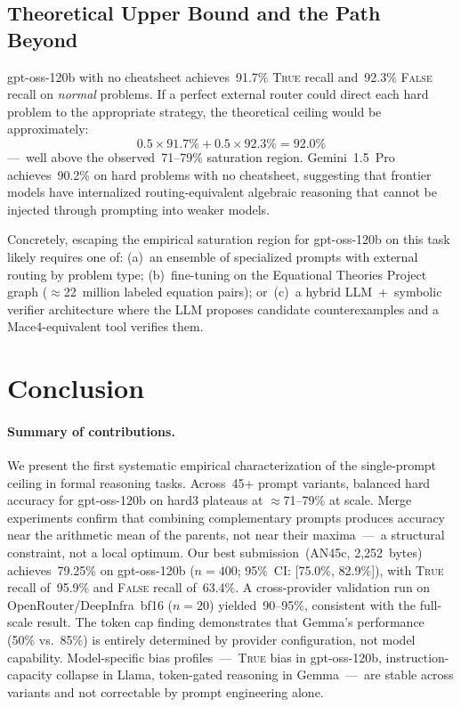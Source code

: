 \documentclass[11pt]{article}
\begin{document}
\subsection{Theoretical Upper Bound and the Path Beyond}

gpt-oss-120b with no cheatsheet achieves~91.7\% \textsc{True} recall
and~92.3\% \textsc{False} recall on \emph{normal} problems. If a
perfect external router could direct each hard problem to the
appropriate strategy, the theoretical ceiling would be approximately:
\[
  0.5 \times 91.7\% + 0.5 \times 92.3\% = 92.0\%
\]
---~well above the observed~71--79\% saturation region. Gemini~1.5~Pro
achieves~90.2\% on hard problems with no cheatsheet, suggesting that
frontier models have internalized routing-equivalent algebraic reasoning
that cannot be injected through prompting into weaker models.

Concretely, escaping the empirical saturation region for gpt-oss-120b
on this task likely requires one of:
(a)~an ensemble of specialized prompts with external routing by problem
type; (b)~fine-tuning on the Equational Theories Project graph
($\approx$22~million labeled equation pairs); or~(c)~a hybrid
LLM~+~symbolic verifier architecture where the LLM proposes candidate
counterexamples and a Mace4-equivalent tool verifies them.

\section{Conclusion}
\label{sec:conclusion}

\paragraph{Summary of contributions.}
We present the first systematic empirical characterization of the
single-prompt ceiling in formal reasoning tasks. Across~45+ prompt
variants, balanced hard accuracy for gpt-oss-120b on hard3 plateaus at
$\approx$71--79\% at scale. Merge experiments confirm that combining
complementary prompts produces accuracy near the arithmetic mean of the
parents, not near their maxima~---~a structural constraint, not a local
optimum. Our best submission~(AN45c, 2{,}252~bytes) achieves~79.25\%
on gpt-oss-120b ($n=400$; 95\%~CI: [75.0\%, 82.9\%]), with \textsc{True}
recall of~95.9\% and \textsc{False} recall of~63.4\%. A cross-provider
validation run on OpenRouter/DeepInfra~bf16 ($n=20$) yielded~90--95\%,
consistent with the full-scale result. The token cap finding demonstrates
that Gemma's performance (50\% vs.~85\%) is entirely determined by
provider configuration, not model capability. Model-specific bias
profiles~---~\textsc{True} bias in gpt-oss-120b, instruction-capacity
collapse in Llama, token-gated reasoning in Gemma~---~are stable across
variants and not correctable by prompt engineering alone.
\end{document}

